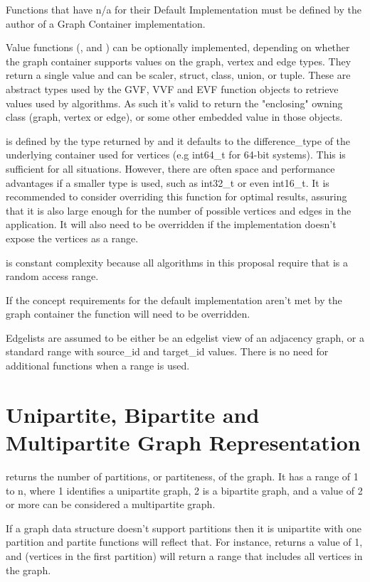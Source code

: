 Functions that have n/a for their Default Implementation must be defined by the author of a Graph Container implementation. 

Value functions (,  and ) can be optionally implemented, 
depending on whether the graph container supports values on the graph, vertex and edge types. They return a single value and can 
be scaler, struct, class, union, or tuple. These are abstract types used by the GVF, VVF and EVF function objects to retrieve
values used by algorithms. As such it's valid to return the "enclosing" owning class (graph, vertex or edge), or some other
embedded value in those objects.

 is defined by the type returned by  and it defaults to the difference\_type of the underlying container used for vertices (e.g int64\_t for 64-bit systems). This is sufficient for all situations. However, there are often space and performance advantages if a smaller type is used, such as int32\_t or even int16\_t. It is recommended to consider overriding this function for optimal results, assuring that it is also large enough for the number of possible vertices and edges in the application. It will also need to be overridden if the implementation doesn't expose the vertices as a range.

 is constant complexity because all algorithms in this proposal require that  is a random access range. 

If the concept requirements for the default implementation aren't met by the graph container the function will need to be overridden.

Edgelists are assumed to be either be an edgelist view of an adjacency graph, or a standard range with source\_id and target\_id values. There is no need for additional functions when a range is used.

\section{Unipartite, Bipartite and Multipartite Graph Representation}

 returns the number of partitions, or partiteness, of the graph. It has a range of 1 to n, where 1 identifies 
a unipartite graph, 2 is a bipartite graph, and a value of 2 or more can be considered a multipartite graph. 

If a graph data structure doesn't support partitions then it is unipartite with one partition and partite functions will reflect that. 
For instance,  returns a value of 1, and  (vertices in the first partition) will return a range that includes all vertices in the graph.

